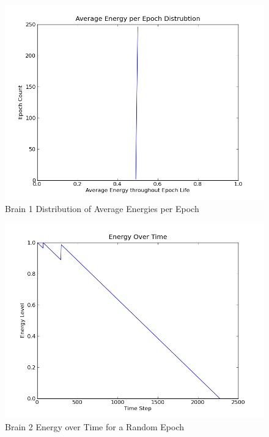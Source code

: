 \documentclass[a4paper,11pt]{article}
\begin{document}
\begin{figure}
\begin{center}
  \includegraphics[scale=1.0]{img/brain1/avgenergyGauss-0.01.png}
  \caption{Brain 1 Distribution of Average Energies per Epoch}
  \label{fig:b1avgenergy}
\end{center}
\end{figure}








\begin{figure}
\begin{center}
  \includegraphics[scale=1.0]{img/brain2/1353128412-0.250000-EvT.png}
  \caption{Brain 2 Energy over Time for a Random Epoch}
  \label{fig:b2evt}
\end{center}
\end{figure}
\end{document}
